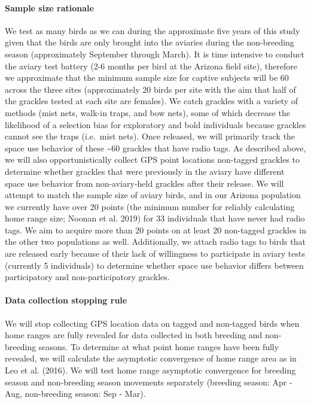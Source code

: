 \documentclass[
]{article}
\begin{document}
\hypertarget{sample-size-rationale}{%
\paragraph{Sample size rationale}\label{sample-size-rationale}}

We test as many birds as we can during the approximate five years of
this study given that the birds are only brought into the aviaries
during the non-breeding season (approximately September through March).
It is time intensive to conduct the aviary test battery (2-6 months per
bird at the Arizona field site), therefore we approximate that the
minimum sample size for captive subjects will be 60 across the three
sites (approximately 20 birds per site with the aim that half of the
grackles tested at each site are females). We catch grackles with a
variety of methods (mist nets, walk-in traps, and bow nets), some of
which decrease the likelihood of a selection bias for exploratory and
bold individuals because grackles cannot see the traps (i.e.~mist nets).
Once released, we will primarily track the space use behavior of these
\textasciitilde60 grackles that have radio tags. As described above, we
will also opportunistically collect GPS point locations non-tagged
grackles to determine whether grackles that were previously in the
aviary have different space use behavior from non-aviary-held grackles
after their release. We will attempt to match the sample size of aviary
birds, and in our Arizona population we currently have over 20 points
(the minimum number for reliably calculating home range size; Noonan et
al. 2019) for 33 individuals that have never had radio tags. We aim to
acquire more than 20 points on at least 20 non-tagged grackles in the
other two populations as well. Additionally, we attach radio tags to
birds that are released early because of their lack of willingness to
participate in aviary tests (currently 5 individuals) to determine
whether space use behavior differs between participatory and
non-participatory grackles.

\hypertarget{data-collection-stopping-rule}{%
\paragraph{Data collection stopping
rule}\label{data-collection-stopping-rule}}

We will stop collecting GPS location data on tagged and non-tagged birds
when home ranges are fully revealed for data collected in both breeding
and non-breeding seasons. To determine at what point home ranges have
been fully revealed, we will calculate the asymptotic convergence of
home range area as in Leo et al. (2016). We will test home range
asymptotic convergence for breeding season and non-breeding season
movements separately (breeding season: Apr - Aug, non-breeding season:
Sep - Mar).
\end{document}
